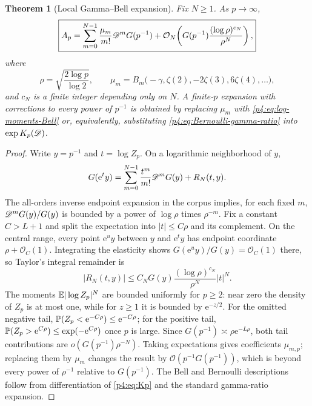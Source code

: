 \documentclass[11pt,oneside]{article}
\newtheorem{theorem}{Theorem}[section]
\theoremstyle{definition}
\theoremstyle{remark}
\newcommand{\e}{\mathrm e}
\newcommand{\bigO}{\mathcal O}
\newcommand{\smallo}{o}
\begin{document}
\begin{theorem}[Local Gamma--Bell expansion]
\label{p4:thm:Gamma-Bell-expansion}
Fix $N\geq1$.  As $p\to\infty$,
\begin{equation}
 \boxed{
 A_p=
 \sum_{m=0}^{N-1}\frac{\mu_m}{m!}
 \Dop^mG(p^{-1})
 +\bigO_{N}\!\left(
 G(p^{-1})\frac{(\log\rho)^{c_N}}{\rho^N}
 \right),}
 \label{p4:eq:Gamma-Bell-expansion}
\end{equation}
where
\begin{equation}
 \rho=\sqrt{\frac{2\log p}{\log2}},
 \qquad
 \mu_m=B_m\bigl(-\gamma,\zeta(2),-2\zeta(3),6\zeta(4),\ldots\bigr),
 \label{p4:eq:mu-limit}
\end{equation}
and $c_N$ is a finite integer depending only on $N$.
A finite-$p$ expansion with corrections to every power of $p^{-1}$ is obtained by replacing
$\mu_m$ with \eqref{p4:eq:log-moments-Bell} or, equivalently, substituting
\eqref{p4:eq:Bernoulli-gamma-ratio} into $\exp K_p(\mathscr D)$.
\end{theorem}

\begin{proof}
Write $y=p^{-1}$ and $t=\log Z_p$.  On a logarithmic neighborhood of $y$,
\[
 G(\e^t y)=\sum_{m=0}^{N-1}\frac{t^m}{m!}\Dop^mG(y)+R_N(t,y).
\]
The all-orders inverse endpoint expansion in the corpus implies, for each fixed $m$,
$\mathscr D^mG(y)/G(y)$ is bounded by a power of $\log\rho$ times $\rho^{-m}$.
Fix a constant $C>L+1$ and split the expectation into $|t|\leq C\rho$ and its complement.
On the central range, every point $\e^u y$ between $y$ and $\e^t y$ has endpoint coordinate
$\rho+\bigO_C(1)$.  Integrating the elasticity shows
$G(\e^u y)/G(y)=\bigO_C(1)$ there, so Taylor's integral remainder is
\[
 |R_N(t,y)|\leq C_NG(y)\frac{(\log\rho)^{c_N}}{\rho^N}|t|^N.
\]
The moments $\mathbb E|\log Z_p|^N$ are bounded uniformly for $p\geq2$: near zero the density of
$Z_p$ is at most one, while for $z\geq1$ it is bounded by $\e^{-z/2}$.
For the omitted negative tail,
$\Prob(Z_p<\e^{-C\rho})\leq\e^{-C\rho}$; for the positive tail,
$\Prob(Z_p>\e^{C\rho})\leq\exp(-\e^{C\rho})$ once $p$ is large.  Since
$G(p^{-1})\asymp\rho\e^{-L\rho}$, both tail contributions are
$\smallo(G(p^{-1})\rho^{-N})$.  Taking expectations gives coefficients $\mu_{m,p}$;
replacing them by $\mu_m$ changes the result by $\bigO(p^{-1}G(p^{-1}))$, which is beyond
every power of $\rho^{-1}$ relative to $G(p^{-1})$.  The Bell and Bernoulli descriptions
follow from differentiation of \eqref{p4:eq:Kp} and the standard gamma-ratio expansion.
\end{proof}
\end{document}
